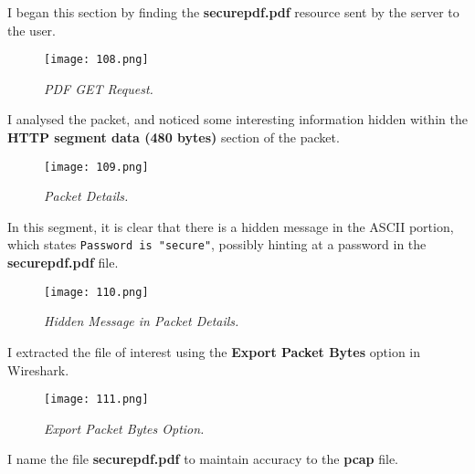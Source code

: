 I began this section by finding the \textbf{securepdf.pdf} resource sent by the server to the user.

\begin{figure}[H]
    \setlength{\abovecaptionskip}{20pt}
    \setlength{\belowcaptionskip}{0pt}
    \centering
    \texttt{[image: 108.png]}
    \captionsetup{justification=centering}
    \caption{\textit{PDF GET Request.}}
    \label{fig:108}
\end{figure}
\vspace{-10pt}

I analysed the packet, and noticed some interesting information hidden within the \textbf{HTTP segment data (480 bytes)} section of the packet.

\begin{figure}[H]
    \setlength{\abovecaptionskip}{20pt}
    \setlength{\belowcaptionskip}{0pt}
    \centering
    \texttt{[image: 109.png]}
    \captionsetup{justification=centering}
    \caption{\textit{Packet Details.}}
    \label{fig:109}
\end{figure}
\vspace{-10pt}

In this segment, it is clear that there is a hidden message in the ASCII portion, which states \texttt{Password is "secure"}, possibly hinting at a password in the \textbf{securepdf.pdf} file.

\begin{figure}[H]
    \setlength{\abovecaptionskip}{20pt}
    \setlength{\belowcaptionskip}{0pt}
    \centering
    \texttt{[image: 110.png]}
    \captionsetup{justification=centering}
    \caption{\textit{Hidden Message in Packet Details.}}
    \label{fig:110}
\end{figure}
\vspace{-10pt}

I extracted the file of interest using the \textbf{Export Packet Bytes} option in Wireshark.

\begin{figure}[H]
    \setlength{\abovecaptionskip}{20pt}
    \setlength{\belowcaptionskip}{0pt}
    \centering
    \texttt{[image: 111.png]}
    \captionsetup{justification=centering}
    \caption{\textit{Export Packet Bytes Option.}}
    \label{fig:111}
\end{figure}
\vspace{-10pt}

I name the file \textbf{securepdf.pdf} to maintain accuracy to the \textbf{pcap} file.


